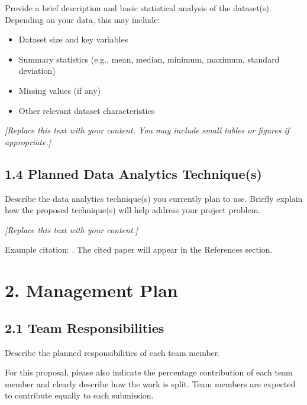 \documentclass[11pt]{article}
\begin{document}
Provide a brief description and basic statistical analysis of the dataset(s). Depending on your data, this may include:

\begin{itemize}[leftmargin=1.5em, itemsep=0pt, topsep=2pt]
    \item Dataset size and key variables
    \item Summary statistics (e.g., mean, median, minimum, maximum, standard deviation)
    \item Missing values (if any)
    \item Other relevant dataset characteristics
\end{itemize}

\textit{[Replace this text with your content. You may include small tables or figures if appropriate.]}

\subsection*{1.4 Planned Data Analytics Technique(s)}

Describe the data analytics technique(s) you currently plan to use. Briefly explain how the proposed technique(s) will help address your project problem.

\textit{[Replace this text with your content.]}

Example citation: \cite{Li_2020_CVPR}. The cited paper will appear in the References section.




\section*{2. Management Plan}

\subsection*{2.1 Team Responsibilities}

Describe the planned responsibilities of each team member.

For this proposal, please also indicate the percentage contribution of each team member and clearly describe how the work is split. Team members are expected to contribute equally to each submission.
\end{document}
